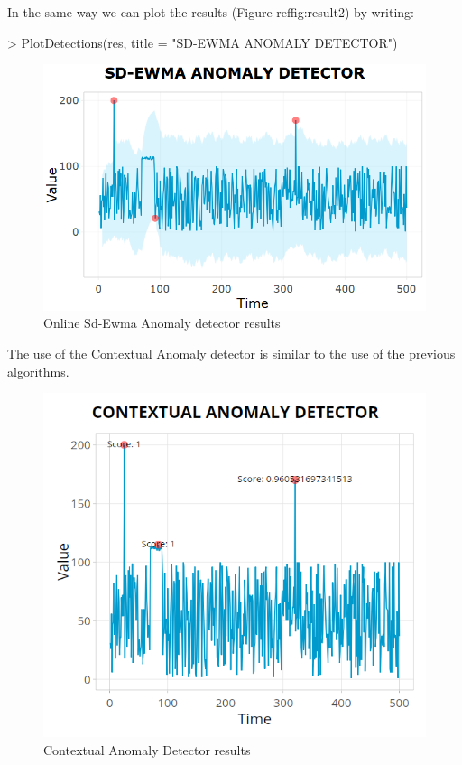 \documentclass[a4paper]{article}
\begin{document}
In the same way we can plot the results (Figure ref{fig:result2}) by writing:

\begin{Schunk}
\begin{Sinput}
> PlotDetections(res, title = "SD-EWMA ANOMALY DETECTOR")
\end{Sinput}
\end{Schunk}

\begin{figure}[htbp]
\centering
\includegraphics[width=0.5\linewidth]{onlineSdEwma.PNG}
\caption{Online Sd-Ewma Anomaly detector results}
\label{fig:result2}
\end{figure}

The use of the Contextual Anomaly detector is similar to the use of the previous algorithms.

\begin{Schunk}
\end{Schunk}

\begin{figure}[htbp]
\centering
\includegraphics[width=0.5\linewidth]{cadose.PNG}
\caption{Contextual Anomaly Detector results}
\label{fig:cad}
\end{figure}
\end{document}
